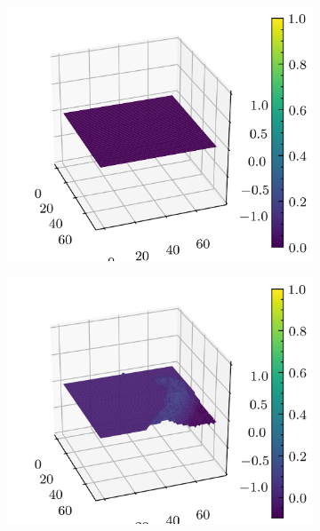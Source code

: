 \documentclass[../document.tex]{subfiles}
\begin{document}
\begin{figure}[H]
    \begin{subfigure}[b]{0.19\textwidth}
        \includegraphics[width=\linewidth]{../img/5/quarry/best/patch-3d-0.png}
    \end{subfigure}
    \begin{subfigure}[b]{0.19\textwidth}
        \includegraphics[width=\linewidth]{../img/5/quarry/best/patch-3d-1.png}
    \end{subfigure}  
    \begin{subfigure}[b]{0.19\textwidth}

\end{subfigure}
\end{figure}
\end{document}
